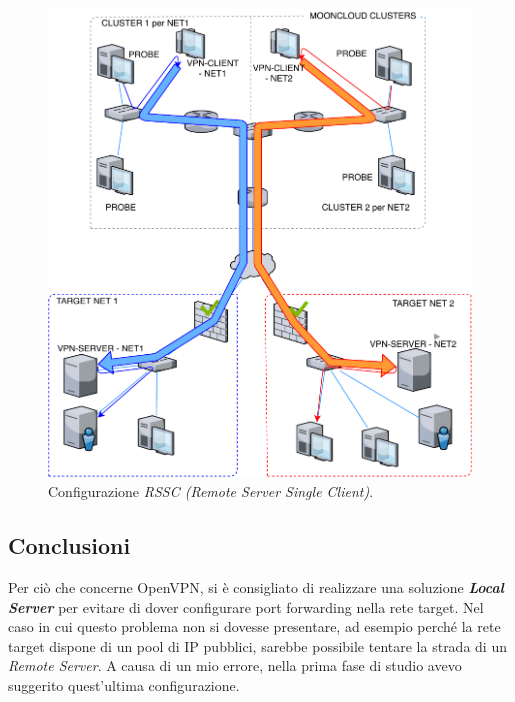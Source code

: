 \begin{figure}
  \includegraphics[scale=0.45]{img/rssc}
  \caption[Configurazione \textit{RSSC (Remote Server Single Client)}]{Configurazione \textit{RSSC (Remote Server Single Client)}.}
\end{figure}

\subsection{Conclusioni}
Per ciò che concerne OpenVPN, si è consigliato di realizzare una soluzione \textbf{\textit{Local Server}} per
evitare di dover configurare port forwarding nella rete target. Nel caso in cui questo
problema non si dovesse presentare, ad esempio perché la rete target dispone di un
pool di IP pubblici, sarebbe possibile tentare la strada di un \textit{Remote Server}.
A causa di un mio errore, nella prima fase di studio avevo suggerito quest'ultima configurazione.
